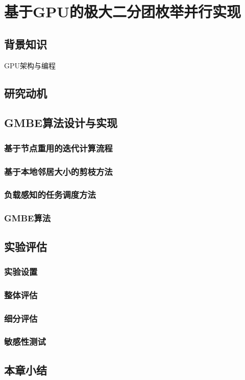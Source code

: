 \chapter{基于GPU的极大二分团枚举并行实现}
\label{ch:gmbe}

\section{背景知识}
GPU架构与编程

\section{研究动机}

\section{GMBE算法设计与实现}

\subsection{基于节点重用的迭代计算流程}

\subsection{基于本地邻居大小的剪枝方法}

\subsection{负载感知的任务调度方法}

\subsection{GMBE算法}

\section{实验评估}

\subsection{实验设置}

\subsection{整体评估}

\subsection{细分评估}

\subsection{敏感性测试}

\section{本章小结}